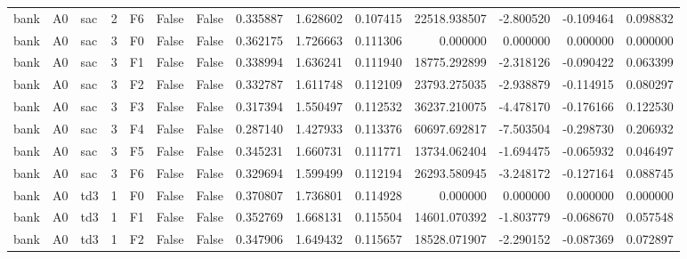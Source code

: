\begin{tabular}{lllrlllrrrrrrr}
      bank &      A0 &       sac &     2 &  F6 &           False &            False &  0.335887 &  1.628602 & 0.107415 &     22518.938507 &          -2.800520 &       -0.109464 &            0.098832 \\
      bank &      A0 &       sac &     3 &  F0 &           False &            False &  0.362175 &  1.726663 & 0.111306 &         0.000000 &           0.000000 &        0.000000 &            0.000000 \\
      bank &      A0 &       sac &     3 &  F1 &           False &            False &  0.338994 &  1.636241 & 0.111940 &     18775.292899 &          -2.318126 &       -0.090422 &            0.063399 \\
      bank &      A0 &       sac &     3 &  F2 &           False &            False &  0.332787 &  1.611748 & 0.112109 &     23793.275035 &          -2.938879 &       -0.114915 &            0.080297 \\
      bank &      A0 &       sac &     3 &  F3 &           False &            False &  0.317394 &  1.550497 & 0.112532 &     36237.210075 &          -4.478170 &       -0.176166 &            0.122530 \\
      bank &      A0 &       sac &     3 &  F4 &           False &            False &  0.287140 &  1.427933 & 0.113376 &     60697.692817 &          -7.503504 &       -0.298730 &            0.206932 \\
      bank &      A0 &       sac &     3 &  F5 &           False &            False &  0.345231 &  1.660731 & 0.111771 &     13734.062404 &          -1.694475 &       -0.065932 &            0.046497 \\
      bank &      A0 &       sac &     3 &  F6 &           False &            False &  0.329694 &  1.599499 & 0.112194 &     26293.580945 &          -3.248172 &       -0.127164 &            0.088745 \\
      bank &      A0 &       td3 &     1 &  F0 &           False &            False &  0.370807 &  1.736801 & 0.114928 &         0.000000 &           0.000000 &        0.000000 &            0.000000 \\
      bank &      A0 &       td3 &     1 &  F1 &           False &            False &  0.352769 &  1.668131 & 0.115504 &     14601.070392 &          -1.803779 &       -0.068670 &            0.057548 \\
      bank &      A0 &       td3 &     1 &  F2 &           False &            False &  0.347906 &  1.649432 & 0.115657 &     18528.071907 &          -2.290152 &       -0.087369 &            0.072897 \\

\end{tabular}

